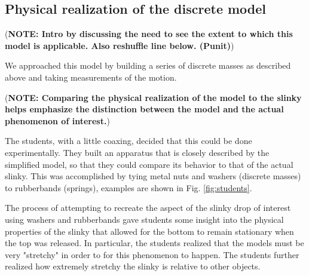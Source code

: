 \documentclass[prb,preprint]{revtex4-1}
\newcommand{\NOTE}[1]{\marginpar{\footnotesize\textbf{NOTE}} (\textbf{NOTE: #1})}
\newcommand{\FIGstudents}{
\begin{figure}[t]\center
\texttt{[image: FIGstudents.pdf]}
\caption{\label{fig:students} Students from the 2012 Compass Project summer program with model slinkies built out of washers and rubberbands.}
\end{figure}
}
\begin{document}
\subsection{Physical realization of the discrete model}
\label{subsec:forcesexperiment}

\NOTE{Intro by discussing the need to see the extent to which this model
is applicable. Also reshuffle line below. (Punit)}

We approached this model
by building a series of discrete masses as described above and taking measurements of
the motion.

\NOTE{Comparing the physical realization of the model to the slinky 
helps emphasize the distinction between the model and the actual phenomenon of interest.}


The students, with a little coaxing, decided that this could be done experimentally.  They built an 
apparatus that is closely described by the simplified model, so that they could compare its behavior to that of the 
actual slinky.  This was accomplished by tying metal nuts and washers (discrete masses) to 
rubberbands (springs), examples are shown in Fig. \ref{fig:students}.  


The process of attempting to recreate the aspect of the slinky drop of interest using washers and rubberbands  
gave students some insight into the physical properties of the slinky that allowed for the bottom to  remain 
stationary when the top was released.  In particular, the students realized that the models must be very "stretchy"
in order to for this phenomenon to happen.  The students further realized how extremely stretchy the slinky is 
relative to other objects.
\end{document}
